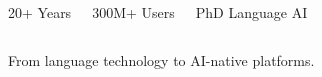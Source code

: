 {\begin{columns}[T,onlytextwidth]

\SBMetric{\linewidth}
{20+}
{Years}

\SBMetric{\linewidth}
{300M+}
{Users}

\SBMetric{\linewidth}
{PhD}
{Language AI}

\end{columns}

\vspace{0.05cm}

\begin{center}
{\SBFontBody\fontsize{9}{11}\selectfont\color{SBGray}
From language technology to AI-native platforms.
}
\end{center}

}